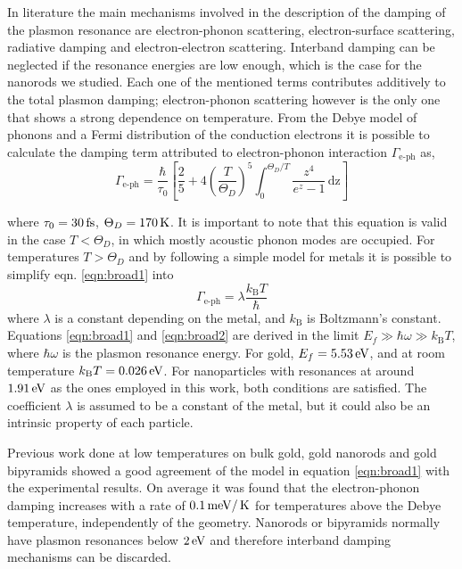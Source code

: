 In literature the main mechanisms involved in the description of the damping of
the plasmon resonance are electron-phonon scattering, electron-surface
scattering, radiative damping and electron-electron
scattering\cite{Sonnichsen2002,Novo2006,Hu2008}.
Interband damping can be neglected if the resonance energies are low enough,
which is the case for the nanorods we studied. Each one of the mentioned terms
contributes additively to the total plasmon damping; electron-phonon scattering
however is the only one that shows a strong dependence on
temperature\cite{Liu2009b,Konrad2013}.
From the Debye model of phonons and a Fermi distribution of the conduction
electrons it is possible to calculate the damping term attributed to
electron-phonon interaction $\Gamma_{\textrm{e-ph}}$ as\cite{McKay1976},
\begin{equation}\label{eqn:broad1}
\Gamma_{\textrm{e-ph}} = 
\frac{\hbar}{\tau_0} \left[ \frac{2}{5}+4 \left( \frac{T}{\Theta_D} \right)^5
\int_0^{\Theta_D/T} \frac{z^4}{e^z - 1}\,\textrm{dz} \right]
\end{equation}

where $\tau_0 = 30\,\textrm{fs}$\cite{Liu2009b}, $\Theta_D = 170\,\textrm{K}$\cite{Link1999b}.  It
is important to note that this equation is valid in the case $T<\Theta_D$, in
which mostly acoustic phonon modes are occupied. For temperatures $T>\Theta_D$
and by following a simple model for metals it is possible to simplify eqn.
\ref{eqn:broad1} into\cite{Kittel1996}
\begin{equation}\label{eqn:broad2}
\Gamma_{\textrm{e-ph}} = \lambda\frac{k_\textrm{B}T}{\hbar}
\end{equation}
where $\lambda$ is a constant depending on the metal, and $k_\textrm{B}$ is
Boltzmann's constant. Equations \ref{eqn:broad1} and \ref{eqn:broad2} are
derived in the limit $E_f \gg \hbar\omega \gg k_\textrm{B}T$, where
$\hbar\omega$ is the plasmon resonance energy. For gold, $E_f = 5.53\,\textrm{eV}$, and at
room temperature $k_\textrm{B}T=0.026\,\textrm{eV}$. For nanoparticles with resonances at around $1.91\,\textrm{eV}$ as the ones employed in this work, both
conditions are satisfied. The coefficient $\lambda$ is assumed to be a constant
of the metal, but it could also be an intrinsic property of each particle.

Previous work done at low temperatures on bulk gold\cite{McKay1976}, gold
nanorods\cite{Konrad2013} and gold bipyramids\cite{Liu2009b} showed a good
agreement of the model in equation \ref{eqn:broad1} with the experimental
results. On average it was found that the electron-phonon damping increases with
a rate of $0.1\,\textrm{meV}/\,\textrm{K}$ for temperatures above the Debye temperature,
independently of the geometry. Nanorods or bipyramids normally have plasmon
resonances below $2\,\textrm{eV}$ and therefore interband damping mechanisms can be
discarded.
\cite{Sundararaman2014,AlejandroManjavacasJunG.LiuVikramKulkarni2014}

